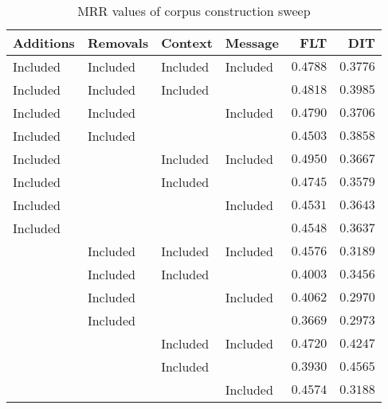 
\begin{table}
\begin{spacing}{1.2}
\centering
\caption{MRR values of \zookeeper corpus construction sweep}
\label{table:zookeeper_corpus_sweep}
\vspace{0.2em}
\begin{tabular}{llll|rr}
\toprule
Additions &  Removals &   Context &   Message &           FLT &           DIT \\
\midrule
 Included &  Included &  Included &  Included &      $0.4788$ &      $0.3776$ \\
 \myrowcolor Included &  Included &  Included &           &      $0.4818$ &      $0.3985$ \\
 Included &  Included &           &  Included &      $0.4790$ &      $0.3706$ \\
 Included &  Included &           &           &      $0.4503$ &      $0.3858$ \\
 Included &           &  Included &  Included & $\bm{0.4950}$ &      $0.3667$ \\
 Included &           &  Included &           &      $0.4745$ &      $0.3579$ \\
 Included &           &           &  Included &      $0.4531$ &      $0.3643$ \\
 Included &           &           &           &      $0.4548$ &      $0.3637$ \\
          &  Included &  Included &  Included &      $0.4576$ &      $0.3189$ \\
          &  Included &  Included &           &      $0.4003$ &      $0.3456$ \\
          &  Included &           &  Included &      $0.4062$ &      $0.2970$ \\
          &  Included &           &           &      $0.3669$ &      $0.2973$ \\
          &           &  Included &  Included &      $0.4720$ &      $0.4247$ \\
          &           &  Included &           &      $0.3930$ & $\bm{0.4565}$ \\
          &           &           &  Included &      $0.4574$ &      $0.3188$ \\
\bottomrule
\end{tabular}

\end{spacing}
\end{table}
